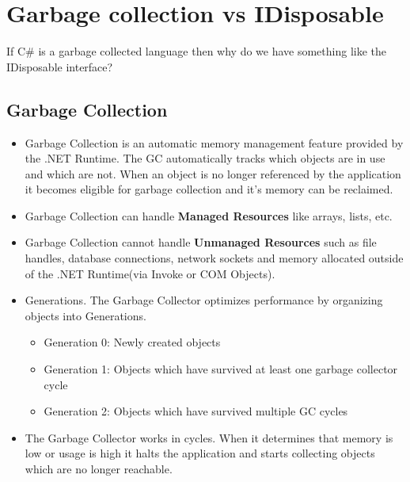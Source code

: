 \chapter{Garbage collection vs IDisposable}

If C\# is a garbage collected language then why do we have something like the IDisposable interface?

\section{Garbage Collection}
\begin{itemize}

\item Garbage Collection is an automatic memory management feature provided by the .NET Runtime. The GC automatically tracks which objects are in use and which are not. When an object is no longer referenced by the application it becomes eligible for garbage collection and it's memory can be reclaimed.

\item Garbage Collection can handle \textbf{Managed Resources} like arrays, lists, etc.

\item Garbage Collection cannot handle \textbf{Unmanaged Resources} such as file handles, database connections, network sockets and memory allocated outside of the .NET Runtime(via Invoke or COM Objects).

\item Generations. The Garbage Collector optimizes performance by organizing objects into Generations.
\begin{itemize}
    \item Generation 0: Newly created objects
    \item Generation 1: Objects which have survived at least one garbage collector cycle
    \item Generation 2: Objects which have survived multiple GC cycles
\end{itemize}

\item The Garbage Collector works in cycles. When it determines that memory is low or usage is high it halts the application and starts collecting objects which are no longer reachable.

\end{itemize}

